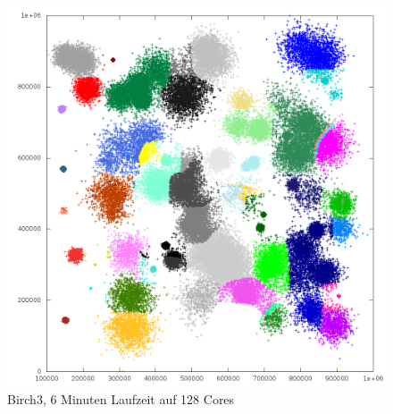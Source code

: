 	\begin{figure}[H]
		\centering
		\includegraphics[scale=0.46]{../meanshift/output/pics/birch3_colored.png} 
		\vspace{-5pt}
		\caption{Birch3, 6 Minuten Laufzeit auf 128 Cores}
	\end{figure}
	\newpage
